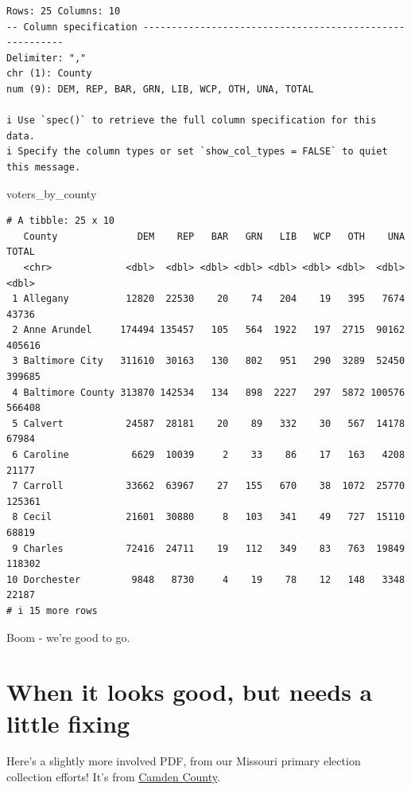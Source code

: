 \documentclass[
  letterpaper,
  DIV=11,
  numbers=noendperiod]{scrreprt}
\newenvironment{Shaded}{\begin{snugshade}}{\end{snugshade}}
\newcommand{\NormalTok}[1]{\textcolor[rgb]{0.00,0.23,0.31}{#1}}
\begin{document}
\begin{verbatim}
Rows: 25 Columns: 10
-- Column specification --------------------------------------------------------
Delimiter: ","
chr (1): County
num (9): DEM, REP, BAR, GRN, LIB, WCP, OTH, UNA, TOTAL

i Use `spec()` to retrieve the full column specification for this data.
i Specify the column types or set `show_col_types = FALSE` to quiet this message.
\end{verbatim}

\begin{Shaded}
\begin{Highlighting}[]
\NormalTok{voters\_by\_county}
\end{Highlighting}
\end{Shaded}

\begin{verbatim}
# A tibble: 25 x 10
   County              DEM    REP   BAR   GRN   LIB   WCP   OTH    UNA  TOTAL
   <chr>             <dbl>  <dbl> <dbl> <dbl> <dbl> <dbl> <dbl>  <dbl>  <dbl>
 1 Allegany          12820  22530    20    74   204    19   395   7674  43736
 2 Anne Arundel     174494 135457   105   564  1922   197  2715  90162 405616
 3 Baltimore City   311610  30163   130   802   951   290  3289  52450 399685
 4 Baltimore County 313870 142534   134   898  2227   297  5872 100576 566408
 5 Calvert           24587  28181    20    89   332    30   567  14178  67984
 6 Caroline           6629  10039     2    33    86    17   163   4208  21177
 7 Carroll           33662  63967    27   155   670    38  1072  25770 125361
 8 Cecil             21601  30880     8   103   341    49   727  15110  68819
 9 Charles           72416  24711    19   112   349    83   763  19849 118302
10 Dorchester         9848   8730     4    19    78    12   148   3348  22187
# i 15 more rows
\end{verbatim}

Boom - we're good to go.

\hypertarget{when-it-looks-good-but-needs-a-little-fixing}{%
\section{When it looks good, but needs a little
fixing}\label{when-it-looks-good-but-needs-a-little-fixing}}

Here's a slightly more involved PDF, from our Missouri primary election
collection efforts! It's from
\href{https://drive.google.com/file/d/1PcsvFpkulCZUM6bnEM74cttf3W0WWC0U/view?usp=sharing}{Camden
County}.
\end{document}
